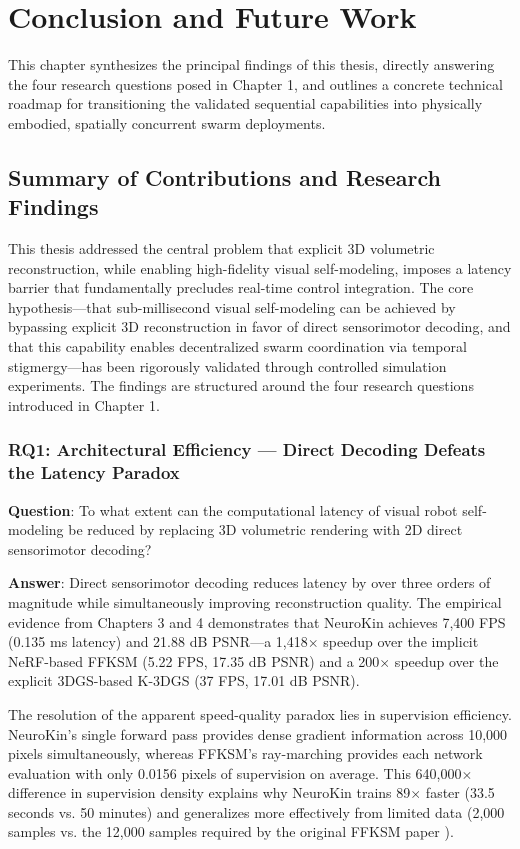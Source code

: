 ﻿\documentclass[12pt,a4paper,oneside]{report}
\begin{document}
\chapter{Conclusion and Future Work}

This chapter synthesizes the principal findings of this thesis, directly answering the four research questions posed in Chapter 1, and outlines a concrete technical roadmap for transitioning the validated sequential capabilities into physically embodied, spatially concurrent swarm deployments.

\section{Summary of Contributions and Research Findings}

This thesis addressed the central problem that explicit 3D volumetric reconstruction, while enabling high-fidelity visual self-modeling, imposes a latency barrier that fundamentally precludes real-time control integration. The core hypothesis---that sub-millisecond visual self-modeling can be achieved by bypassing explicit 3D reconstruction in favor of direct sensorimotor decoding, and that this capability enables decentralized swarm coordination via temporal stigmergy---has been rigorously validated through controlled simulation experiments. The findings are structured around the four research questions introduced in Chapter 1.

\subsection{RQ1: Architectural Efficiency --- Direct Decoding Defeats the Latency Paradox}

\textbf{Question}: To what extent can the computational latency of visual robot self-modeling be reduced by replacing 3D volumetric rendering with 2D direct sensorimotor decoding?

\textbf{Answer}: Direct sensorimotor decoding reduces latency by over three orders of magnitude while simultaneously improving reconstruction quality. The empirical evidence from Chapters 3 and 4 demonstrates that NeuroKin achieves 7,400 FPS (0.135 ms latency) and 21.88 dB PSNR---a 1,418$\times$ speedup over the implicit NeRF-based FFKSM (5.22 FPS, 17.35 dB PSNR) and a 200$\times$ speedup over the explicit 3DGS-based K-3DGS (37 FPS, 17.01 dB PSNR).

The resolution of the apparent speed-quality paradox lies in supervision efficiency. NeuroKin's single forward pass provides dense gradient information across 10,000 pixels simultaneously, whereas FFKSM's ray-marching provides each network evaluation with only 0.0156 pixels of supervision on average. This 640,000$\times$ difference in supervision density explains why NeuroKin trains 89$\times$ faster (33.5 seconds vs. 50 minutes) and generalizes more effectively from limited data (2,000 samples vs. the 12,000 samples required by the original FFKSM paper \cite{hu2024teaching}).
\end{document}
